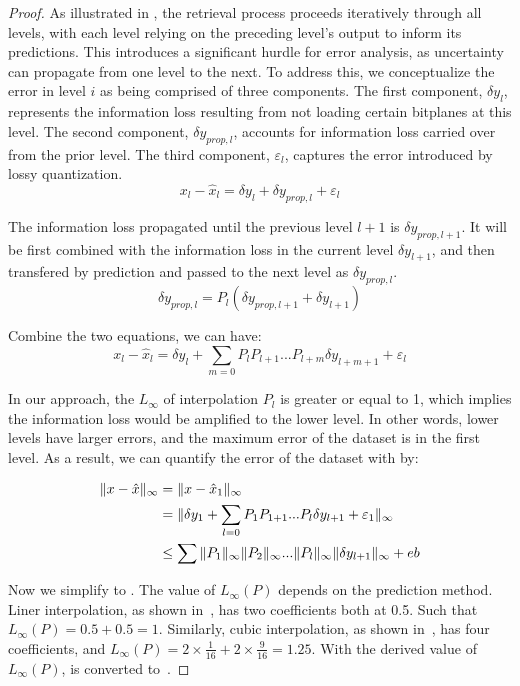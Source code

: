 \renewcommand{\qedsymbol}{}
\begin{proof}
As illustrated in , the retrieval process proceeds iteratively through all levels, with each level relying on the preceding level's output to inform its predictions. This introduces a significant hurdle for error analysis, as uncertainty can propagate from one level to the next. To address this, we conceptualize the error in level $i$ as being comprised of three components. The first component, $\delta y_{l}$, represents the information loss resulting from not loading certain bitplanes at this level. The second component, $\delta y_{prop, l}$, accounts for information loss carried over from the prior level. The third component, $\varepsilon_l$, captures the error introduced by lossy quantization.\begin{equation}
    x_l - \hat x_l = \delta y_l + \delta y_{prop, l} +  \varepsilon_l
\end{equation}

The information loss propagated until the previous level $l+1$ is $\delta y_{prop, l+1}$. It will be first combined with the information loss in the current level $\delta y_{l+1}$, and then transfered by prediction and passed to the next level as $\delta y_{prop, l}$.
\begin{equation}
    \delta y_{prop, l} = P_l(\delta y_{prop, l+1} + \delta y_{l+1})
\end{equation}

Combine the two equations, we can have: 
\begin{equation}
x_l - \hat x_l = \delta y_l + \sum_{m = 0} P_{l}P_{l+1}...P_{l+m} \delta y_{l+m+1} + \varepsilon_l
\label{eq:upperbound_i}
\end{equation}

In our approach, the $L_\infty$ of interpolation $P_l$ is greater or equal to 1, which implies the information loss would be amplified to the lower level. In other words, lower levels have larger errors, and the maximum error of the dataset is in the first level. As a result, we can quantify the error of the dataset with  by:


\begin{align}
\|x-\hat x\|_\infty &= \|x-\hat x_1\|_\infty  \notag \\
&= \|\delta y_1 + \sum_{l = 0} P_{1}P_{1+1}...P_{l} \delta y_{l+1} + \varepsilon_1\|_\infty  \notag \\
&\leq \sum\|P_1\|_\infty\|P_2\|_\infty...\|P_l\|_\infty\|\delta y_{l+1}\|_\infty + eb
\label{eq:upperbound}
\end{align}

Now we simplify  to . The value of $L_\infty(P)$ depends on the prediction method. Liner interpolation, as shown in~, has two coefficients both at 0.5. Such that $L_\infty (P) = 0.5+0.5=1$. Similarly, cubic interpolation, as shown in~, has four coefficients, and $L_\infty(P) = 2\times \frac{1}{16} + 2\times \frac{9}{16} =1.25$. With the derived value of $L_\infty(P)$,  is converted to~.

\end{proof}

